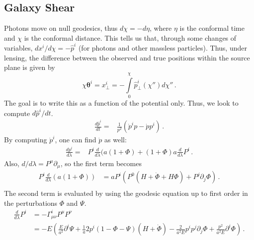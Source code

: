 \subsection{Galaxy Shear}
Photons move on null geodesics, thus $d\chi = -d\eta$, where $\eta$ is the conformal time and $\chi$ is the conformal distance. This tells us that, through some changes of variables, $dx^i/d\chi = -\hat{p}^i$ (for photons and other massless particles). Thus, under lensing, the difference between the observed and true positions within the source plane is given by
\begin{equation}
	\chi\mathbf{\theta}^i = x_\perp^i = -\int\limits_0^\chi \hat{p}^i_\perp(\chi'') d\chi''\,.
\end{equation}
The goal is to write this as a function of the potential only. Thus, we look to compute $d\hat{p}^i/dt$.
\begin{equation}\label{eq:dp-hat-dt}
	\begin{split}
		\frac{d\hat{p}^i}{dt} %
		=& \frac{1}{p^2}(\dot{p}^i p - \dot{p}p^i)\,.
	\end{split}
\end{equation}
By computing $\dot p^i$, one can find $\dot p$ as well:
\begin{equation}
	\begin{split}
		\frac{dp^i}{d\lambda} %
		=& P^i\frac{d}{d\lambda}(a(1+\Phi)+(1+\Phi)a\frac{d}{d\lambda}P^i\,.
	\end{split}
\end{equation}
Also, $d/d\lambda = P^\mu \partial_\mu$, so the first term becomes
\begin{equation}
	\begin{split}
		P^i\frac{d}{d\lambda}(a(1+\Phi)) %
		&= a P^i (P^0(H+\dot\Phi +H\Phi) + P^j\partial_j\Phi)\,. \\
	\end{split}
\end{equation}
The second term is evaluated by using the geodesic equation up to first order in the perturbations $\Phi$ and $\Psi$.
\begin{equation}
	\begin{split}
		\frac{d}{d\lambda}P^i &= -\Gamma^i_{\mu\nu}P^\mu P^\nu \\
		&= -E\left( \frac{E}{a^2} \partial^i\Psi + \frac{1}{a}2p^i(1-\Phi-\Psi)(H+\dot\Phi) - \frac{2}{a^2E}p^ip^j\partial_j\Phi + \frac{p^2}{a^2E} \partial^i\Phi \right)\,.
	\end{split}
\end{equation}
